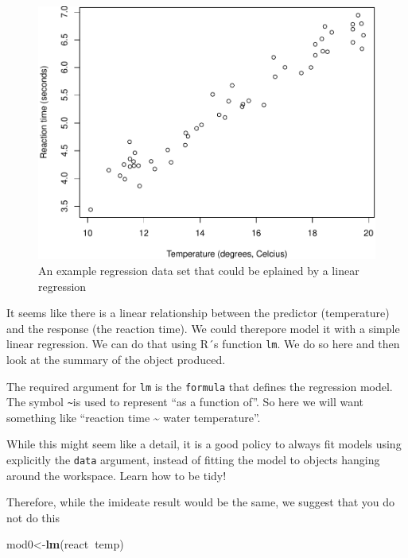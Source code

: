 \documentclass[
]{book}
\newenvironment{Shaded}{\begin{snugshade}}{\end{snugshade}}
\newcommand{\KeywordTok}[1]{\textcolor[rgb]{0.13,0.29,0.53}{\textbf{#1}}}
\newcommand{\NormalTok}[1]{#1}
\newcommand{\OperatorTok}[1]{\textcolor[rgb]{0.81,0.36,0.00}{\textbf{#1}}}
\begin{document}
\begin{figure}

{\centering \includegraphics[width=0.8\linewidth]{ECOMODbook_files/figure-latex/Freg-1} 

}

\caption{An example regression data set that could be eplained by a linear regression}\label{fig:Freg}
\end{figure}

It seems like there is a linear relationship between the predictor (temperature) and the response (the reaction time). We could therepore model it with a simple linear regression. We can do that using R´s function \texttt{lm}. We do so here and then look at the summary of the object produced.

The required argument for \texttt{lm} is the \texttt{formula} that defines the regression model. The symbol \texttt{\textasciitilde{}}is used to represent ``as a function of''. So here we will want something like ``reaction time \textasciitilde{} water temperature''.

While this might seem like a detail, it is a good policy to always fit models using explicitly the \texttt{data} argument, instead of fitting the model to objects hanging around the workspace. Learn how to be tidy!

Therefore, while the imideate result would be the same, we suggest that you do not do this

\begin{Shaded}
\begin{Highlighting}[]
\NormalTok{mod0<-}\KeywordTok{lm}\NormalTok{(react}\OperatorTok{~}\NormalTok{temp)}
\end{Highlighting}
\end{Shaded}
\end{document}
